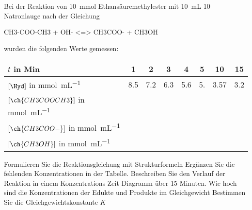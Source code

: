 \documentclass[DIV11]{scrartcl}
\begin{document}
\begin{question}[name=Bestimmung der Gleichgewichtskonstanten bei der Esterhydrolyse]
Bei der Reaktion von \SI{10}{\milli\mole} Ethansäuremethylester mit \SI{10}{\milli\liter}
\SI{10}{\Molar} Natronlauge nach der Gleichung
\begin{reaction*}
 CH3-COO-CH3 + OH- <=> CH3COO- + CH3OH
\end{reaction*}
wurden die folgenden Werte gemessen:
\begin{center}
 \begin{tabular}{ l*{7}{S[table-format=1.2]}}
  \toprule
   $t$ in Min
     & 1   & 2   & 3   & 4   & 5  & 10    & 15 \\
  \midrule
   $[\Hyd]$ in \si{\milli\mole\per\milli\liter}
     & 8.5 & 7.2 & 6.3 & 5.6 & 5. &  3.57 &  3.2 \\
   $[\ch{CH3COOCH3}]$ in \si{\milli\mole\per\milli\liter} \\
   $[\ch{CH3COO-}]$ in \si{\milli\mole\per\milli\liter} \\
   $[\ch{CH3OH}]$ in \si{\milli\mole\per\milli\liter} \\
  \bottomrule
 \end{tabular}
\end{center}
\begin{tasks}
  \task Formulieren Sie die Reaktionsgleichung mit Strukturformeln
  \task Ergänzen Sie die fehlenden Konzentrationen in der Tabelle.
  \task Beschreiben Sie den Verlauf der Reaktion in einem
    Konzentrations-Zeit-Diagramm über \num{15} Minuten.
  \task Wie hoch sind die Konzentrationen der Edukte und Produkte im
    Gleichgewicht
  \task Bestimmen Sie die Gleichgewichtskonstante $K$
\end{tasks}
\end{question}
\end{document}
